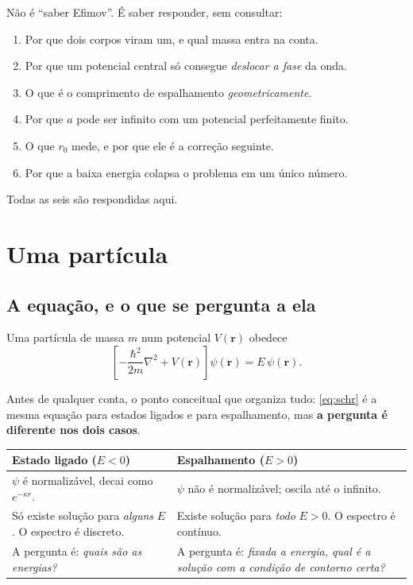 \documentclass[11pt,a4paper]{article}
\renewcommand{\vec}[1]{\mathbf{#1}}
\begin{document}
\begin{ponte}
Não é ``saber Efimov''. É saber responder, sem consultar:
\begin{enumerate}[leftmargin=*, itemsep=1pt, topsep=2pt]
\item Por que dois corpos viram um, e qual massa entra na conta.
\item Por que um potencial central só consegue \emph{deslocar a fase} da onda.
\item O que é o comprimento de espalhamento \emph{geometricamente}.
\item Por que $a$ pode ser infinito com um potencial perfeitamente finito.
\item O que $r_{0}$ mede, e por que ele é a correção seguinte.
\item Por que a baixa energia colapsa o problema em um único número.
\end{enumerate}
Todas as seis são respondidas aqui.
\end{ponte}

\newpage
\tableofcontents
\newpage

\section{Uma partícula}

\subsection{A equação, e o que se pergunta a ela}

Uma partícula de massa $m$ num potencial $V(\vec r)$ obedece
\begin{equation}
\left[-\frac{\hbar^{2}}{2m}\nabla^{2} + V(\vec r)\right]\psi(\vec r) = E\,\psi(\vec r).
\label{eq:schr}
\end{equation}

Antes de qualquer conta, o ponto conceitual que organiza tudo: \eqref{eq:schr} é a
mesma equação para estados ligados e para espalhamento, mas \textbf{a pergunta é
diferente nos dois casos}.

\begin{center}
\begin{tabular}{@{}p{}p{}@{}}
\toprule
\textbf{Estado ligado} ($E<0$) & \textbf{Espalhamento} ($E>0$) \\
\midrule
$\psi$ é normalizável, decai como $e^{-\kappa r}$. & $\psi$ não é normalizável; oscila até o infinito.\\[3pt]
Só existe solução para \emph{alguns} $E$. O espectro é discreto. & Existe solução para \emph{todo} $E>0$. O espectro é contínuo.\\[3pt]
A pergunta é: \emph{quais são as energias?} & A pergunta é: \emph{fixada a energia, qual é a solução com a condição de contorno certa?}\\
\bottomrule
\end{tabular}
\end{center}
\end{document}
